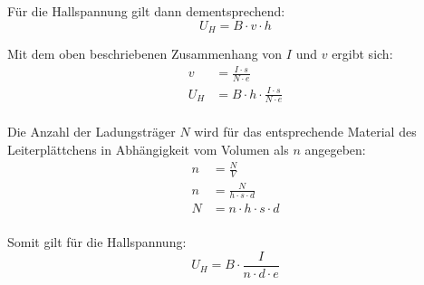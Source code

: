 Für die Hallspannung gilt dann dementsprechend:
$$U_H = B \cdot v \cdot h$$

Mit dem oben beschriebenen Zusammenhang von $I$ und $v$ ergibt sich:
\begin{align*}
v &= \frac{I \cdot s}{N \cdot e} \\
U_H &= B \cdot h \cdot \frac{I \cdot s}{N \cdot e} \\
\end{align*}

Die Anzahl der Ladungsträger $N$ wird für das entsprechende Material des Leiterplättchens in Abhängigkeit vom Volumen als $n$ angegeben:
\begin{align*}
n &= \frac{N}{V} \\
n &= \frac{N}{h \cdot s \cdot d} \\
N &= n \cdot h \cdot s \cdot d \\
\end{align*}

Somit gilt für die Hallspannung:
$$U_H = B \cdot \frac{I}{n \cdot d \cdot e}$$